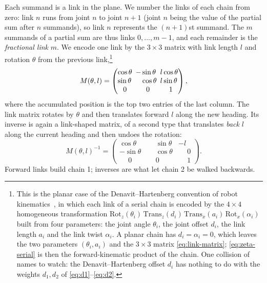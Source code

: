 \documentclass[11pt]{article}
\makeatletter
\theoremstyle{definition}
\newcommand{\linkmat}[2]{%
\left(\begin{array}{@{}l@{\ \,}l@{\ \,}l@{}}
\cos #1 & -\sin #1           & #2\cos #1\\
\sin #1 & \phantom{-}\cos #1 & #2\sin #1\\
\multicolumn{1}{@{}c@{\ \,}}{0} & \multicolumn{1}{c@{\ \,}}{0} & \multicolumn{1}{c@{}}{1}
\end{array}\right)}
\makeatother
\begin{document}
Each summand is a link in the plane. We number the
links of each chain from zero: link $n$ runs from joint $n$ to joint $n+1$
(joint $n$ being the value of the partial sum after $n$ summands), so link $n$
represents the $(n+1)$st summand. The $m$ summands of a partial sum are thus
links $0,\dots,m-1$, and each remainder is the \emph{fractional link} $m$. We
encode one link by the $3\times3$ matrix with link length $l$ and rotation
$\theta$ from the previous link,\footnote{This is the planar case of the
Denavit--Hartenberg convention of robot kinematics~\cite{DenavitHartenberg1955},
in which each link of a serial chain is encoded by the $4\times4$ homogeneous
transformation
$\mathrm{Rot}_z(\theta_i)\,\mathrm{Trans}_z(d_i)\,\mathrm{Trans}_x(a_i)\,
\mathrm{Rot}_x(\alpha_i)$
built from four parameters: the joint angle $\theta_i$, the joint offset $d_i$,
the link length $a_i$ and the link twist $\alpha_i$. A planar chain has
$d_i=\alpha_i=0$, which leaves the two parameters $(\theta_i,a_i)$ and the
$3\times3$ matrix \eqref{eq:link-matrix}; \eqref{eq:zeta-serial} is then the
forward-kinematic product of the chain. One collision of names to watch: the
Denavit--Hartenberg offset $d_i$ has nothing to do with the weights $d_1,d_2$ of
\eqref{eq:d1}--\eqref{eq:d2}.}
\begin{equation}\label{eq:link-matrix}
M(\theta,l)=\linkmat{\theta}{l},
\end{equation}
where the accumulated position is the top two entries of the last column.
The link matrix rotates by $\theta$ and then translates forward $l$
along the new heading. Its inverse is again a link-shaped matrix, of a
second type that translates \emph{back} $l$ along the current heading and
then undoes the rotation:
\begin{equation}\label{eq:link-matrix-2}
M(\theta,l)^{-1}=
\begin{pmatrix}
\cos\theta & \phantom{-}\sin\theta & -l\\
-\sin\theta & \phantom{-}\cos\theta & \phantom{-}0\\
\phantom{-}0 & \phantom{-}0 & \phantom{-}1
\end{pmatrix}.
\end{equation}
Forward links build chain 1; inverses are what let chain 2 be walked
backwards.
\end{document}
